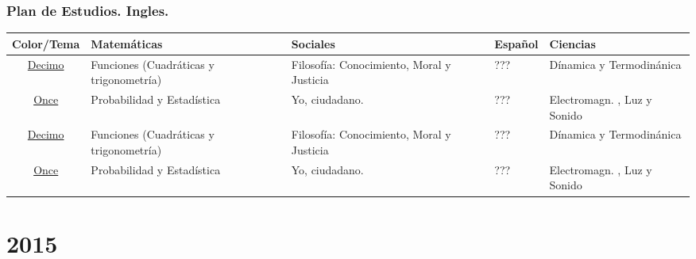 \documentclass{beamer}
\begin{document}
\begin{frame}
\fontsize{9pt}{10}\selectfont
\frametitle{Plan de Estudios. Ingles.}
\begin{table}
\centering
\begin{tabular}{|c|p{2cm}|p{2cm}|p{2cm}|p{2cm}|}
\hline 
\textbf{Color/Tema} & \textbf{Matem\'aticas} &\textbf{Sociales} &\textbf{Espa\~nol} & \textbf{Ciencias}\\
\hline
\underline{Decimo} & Funciones (Cuadr\'aticas y trigonometr\'ia)  & Filosof\'ia: Conocimiento, Moral y Justicia & ???& D\'inamica y Termodin\'anica\\
\underline{Once} & Probabilidad y Estad\'istica & Yo, ciudadano. & ??? & Electromagn. , Luz y Sonido \\
\underline{Decimo} & Funciones (Cuadr\'aticas y trigonometr\'ia)  & Filosof\'ia: Conocimiento, Moral y Justicia & ???& D\'inamica y Termodin\'anica\\
\underline{Once} & Probabilidad y Estad\'istica & Yo, ciudadano. & ??? & Electromagn. , Luz y Sonido \\

\hline 
\end{tabular}
\end{table}
\end{frame}
\section{2015}
\end{document}
